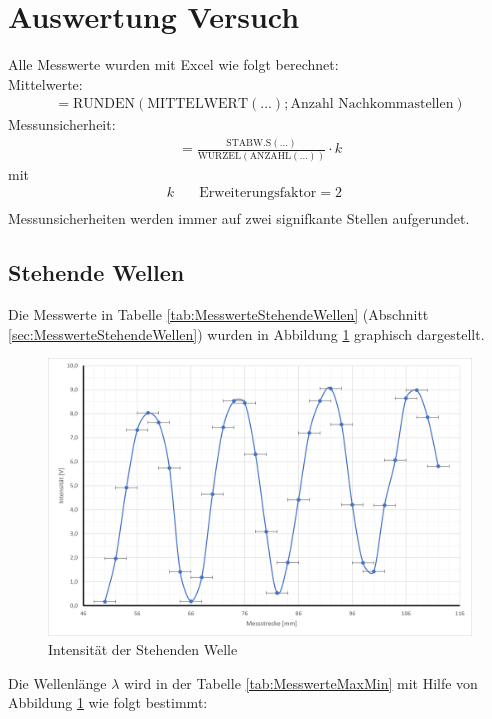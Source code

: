 \documentclass[a4paper]{scrartcl}
\numberwithin{equation}{subsection}
\begin{document}
\section{Auswertung Versuch}
\label{sec:runden}
Alle Messwerte wurden mit Excel wie folgt berechnet:\\
Mittelwerte:
\begin{align}
=\text{RUNDEN}(\text{MITTELWERT}(...);\text{Anzahl Nachkommastellen})
\label{eq:mittelWert}
\end{align}
Messunsicherheit:
\begin{align}
=\frac{\text{STABW.S}(...)}{\text{WURZEL}(\text{ANZAHL}(...))} \cdot k
\label{eq:Unsicherheit}
\end{align}
mit
\begin{align*}
k \quad &\text{Erweiterungsfaktor} = 2&\\
\end{align*}
Messunsicherheiten werden immer auf zwei signifkante Stellen aufgerundet.
\subsection{Stehende Wellen}
Die Messwerte in Tabelle \ref{tab:MesswerteStehendeWellen} (Abschnitt \ref{sec:MesswerteStehendeWellen}) wurden in Abbildung \ref{fig:DiagrammStehendeWelle} graphisch dargestellt.

\begin{figure}[H]
\includegraphics[width=12cm]{Diagramm_Stehende_Wellen}
\centering
\caption{Intensität der Stehenden Welle}
\centering
\label{fig:DiagrammStehendeWelle}
\end{figure}

Die Wellenlänge $\lambda$ wird in der Tabelle \ref{tab:MesswerteMaxMin} mit Hilfe von Abbildung \ref{fig:DiagrammStehendeWelle} wie folgt bestimmt:
\end{document}
